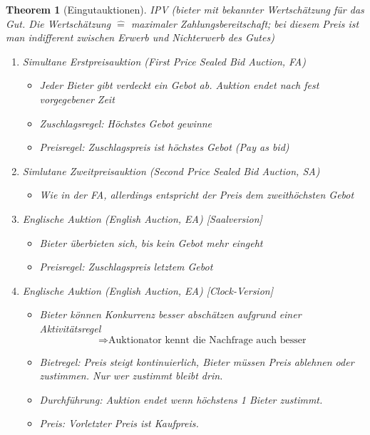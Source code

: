 \documentclass[12pt]{extreport} %
\theoremstyle{named}
\newtheorem*{unnamedtheorem*}{Theorem}
\theoremstyle{itshape}
\theoremstyle{normal}
\begin{document}
\newpage

\begin{unnamedtheorem*}[Eingutauktionen]
	IPV (bieter mit bekannter Wertschätzung für das Gut. Die Wertschätzung $\hat=$ maximaler Zahlungsbereitschaft; bei diesem Preis ist man indifferent zwischen Erwerb und Nichterwerb des Gutes)
	
	\begin{enumerate}
		\item Simultane Erstpreisauktion (First Price Sealed Bid Auction, FA)   
			\begin{itemize}
				\item Jeder Bieter gibt verdeckt ein Gebot ab. Auktion endet nach fest vorgegebener Zeit
				\item Zuschlagsregel: Höchstes Gebot gewinne
				\item Preisregel: Zuschlagspreis ist höchstes Gebot (Pay as bid)
			\end{itemize}
		\item Simlutane Zweitpreisauktion (Second Price Sealed Bid Auction, SA)   
			\begin{itemize}
				\item Wie in der FA, allerdings entspricht der Preis dem zweithöchsten Gebot
			\end{itemize}
		\item Englische Auktion (English Auction, EA) [Saalversion]   
			\begin{itemize}
				\item Bieter überbieten sich, bis kein Gebot mehr eingeht
				\item Preisregel: Zuschlagspreis letztem Gebot
			\end{itemize}
		\item Englische Auktion (English Auction, EA) [Clock-Version]
			\begin{itemize}
				\item Bieter können Konkurrenz besser abschätzen aufgrund einer Aktivitätsregel
					$$ \Rightarrow \text{Auktionator kennt die Nachfrage auch besser} $$
				\item Bietregel: Preis steigt kontinuierlich, Bieter müssen Preis ablehnen oder zustimmen. Nur wer zustimmt bleibt drin.
				\item Durchführung: Auktion endet wenn höchstens 1 Bieter zustimmt.
				\item Preis: Vorletzter Preis ist Kaufpreis.

\end{itemize}
\end{enumerate}
\end{unnamedtheorem*}
\end{document}
